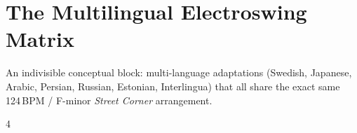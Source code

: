 \documentclass[a4paper,landscape]{memoir}
\begin{document}
\chapter{The Multilingual Electroswing Matrix}
An indivisible conceptual block: multi-language adaptations (Swedish, Japanese, Arabic, Persian, Russian, Estonian, Interlingua) that all share the exact same 124\,BPM / F-minor \emph{Street Corner} arrangement.
\clearpage\begin{multicols*}{4}
\end{multicols*}

\appendix

\backmatter
\printindex[songs]
\clearpage
\printindex[tags]
\end{document}
